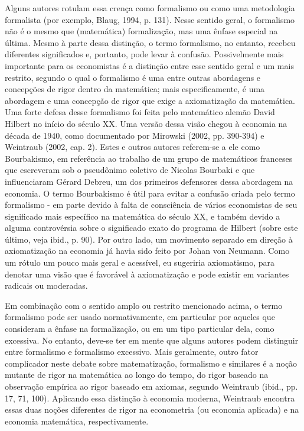 \documentclass[a4paper,12pt]{article}[abntex2]
\begin{document}
Alguns autores rotulam essa crença como formalismo ou como uma metodologia formalista (por exemplo, Blaug, 1994, p. 131). Nesse sentido geral, o formalismo não é o mesmo que (matemática) formalização, mas uma ênfase especial na última. Mesmo à parte dessa distinção, o termo formalismo, no entanto, recebeu diferentes significados e, portanto, pode levar à confusão. Possivelmente mais importante para os economistas é a distinção entre esse sentido geral e um mais restrito, segundo o qual o formalismo é uma entre outras abordagens e concepções de rigor dentro da matemática; mais especificamente, é uma abordagem e uma concepção de rigor que exige a axiomatização da matemática. Uma forte defesa desse formalismo foi feita pelo matemático alemão David Hilbert no início do século XX. Uma versão dessa visão chegou à economia na década de 1940, como documentado por Mirowski (2002, pp. 390-394) e Weintraub (2002, cap. 2). Estes e outros autores referem-se a ele como Bourbakismo, em referência ao trabalho de um grupo de matemáticos franceses que escreveram sob o pseudônimo coletivo de Nicolas Bourbaki e que influenciaram Gérard Debreu, um dos primeiros defensores dessa abordagem na economia. O termo Bourbakismo é útil para evitar a confusão criada pelo termo formalismo - em parte devido à falta de consciência de vários economistas de seu significado mais específico na matemática do século XX, e também devido a alguma controvérsia sobre o significado exato do programa de Hilbert (sobre este último, veja ibid., p. 90). Por outro lado, um movimento separado em direção à axiomatização na economia já havia sido feito por Johan von Neumann. Como um rótulo um pouco mais geral e acessível, eu sugeriria axiomatismo, para denotar uma visão que é favorável à axiomatização e pode existir em variantes radicais ou moderadas.

Em combinação com o sentido amplo ou restrito mencionado acima, o termo formalismo pode ser usado normativamente, em particular por aqueles que consideram a ênfase na formalização, ou em um tipo particular dela, como excessiva. No entanto, deve-se ter em mente que alguns autores podem distinguir entre formalismo e formalismo excessivo. Mais geralmente, outro fator complicador neste debate sobre matematização, formalismo e similares é a noção mutante de rigor na matemática ao longo do tempo, do rigor baseado na observação empírica ao rigor baseado em axiomas, segundo Weintraub (ibid., pp. 17, 71, 100). Aplicando essa distinção à economia moderna, Weintraub encontra essas duas noções diferentes de rigor na econometria (ou economia aplicada) e na economia matemática, respectivamente.
\end{document}
